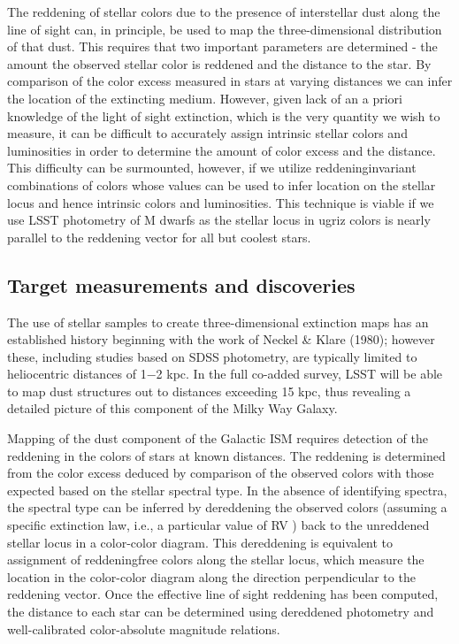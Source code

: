 The reddening of stellar colors due to the presence of interstellar dust along the line of sight can,
in principle, be used to map the three-dimensional distribution of that dust. This requires that
two important parameters are determined - the amount the observed stellar color is reddened and
the distance to the star. By comparison of the color excess measured in stars at varying distances
we can infer the location of the extincting medium. However, given lack of an a priori knowledge
of the light of sight extinction, which is the very quantity we wish to measure, it can be difficult
to accurately assign intrinsic stellar colors and luminosities in order to determine the amount of
color excess and the distance. This difficulty can be surmounted, however, if we utilize reddeninginvariant
combinations of colors whose values can be used to infer location on the stellar locus
and hence intrinsic colors and luminosities. This technique is viable if we use LSST photometry of
M dwarfs as the stellar locus in ugriz colors is nearly parallel to the reddening vector for all but
coolest stars.



\subsection{Target measurements and discoveries}
\label{sec:\secname:targets}

The use of stellar samples to create three-dimensional extinction maps has an established history
beginning with the work of Neckel & Klare (1980); however these, including studies based on SDSS
photometry, are typically limited to heliocentric distances of 1−2 kpc. In the full co-added survey,
LSST will be able to map dust structures out to distances exceeding 15 kpc, thus revealing a
detailed picture of this component of the Milky Way Galaxy.

Mapping of the dust component of the Galactic ISM requires detection of the reddening in the
colors of stars at known distances. The reddening is determined from the color excess deduced
by comparison of the observed colors with those expected based on the stellar spectral type. In
the absence of identifying spectra, the spectral type can be inferred by dereddening the observed
colors (assuming a specific extinction law, i.e., a particular value of RV ) back to the unreddened
stellar locus in a color-color diagram. This dereddening is equivalent to assignment of reddeningfree
colors along the stellar locus, which measure the location in the color-color diagram along
the direction perpendicular to the reddening vector. Once the effective line of sight reddening has
been computed, the distance to each star can be determined using dereddened photometry and
well-calibrated color-absolute magnitude relations.


